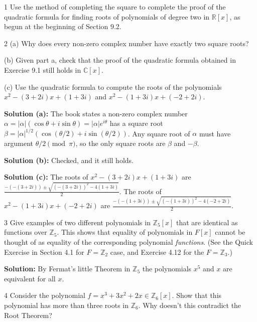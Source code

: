 \begin{problem}{1}
    Use the method of completing the square to complete the proof of the quadratic
    formula for finding roots of polynomials of degree two in $\mathbb{R}[x]$, as begun at
    the beginning of Section 9.2.
\end{problem}
\unsolved

\begin{problem}{2}
    (a) Why does every non-zero complex number have exactly 
        two square roots?

    (b) Given part a, check that the proof of the quadratic formula 
        obtained in Exercise 9.1 still holds in $\mathbb{C}[x]$.

    (c) Use the quadratic formula to compute the roots of the polynomials 
        $x^2 - (3 + 2i)x + (1 + 3i)$ and $x^2 - (1 + 3i)x + (-2 + 2i)$.
\end{problem}
\solved

\textbf{Solution (a):}
The book states a non-zero complex number $\alpha = |\alpha|(\cos \theta + i \sin \theta) = |\alpha|e^{i \theta}$
has a square root $\beta = |\alpha|^{1/2}(\cos(\theta/2) + i \sin(\theta/2))$.
Any square root of $\alpha$ must have argument $\theta/2 \pmod{\pi}$, so the only square roots are $\beta$ and $-\beta$.

\textbf{Solution (b):} Checked, and it still holds.

\textbf{Solution (c):}
The roots of $x^2 - (3 + 2i)x + (1 + 3i)$ are
$\frac{-(-(3 + 2i)) \pm \sqrt{(-(3 + 2i))^2 - 4(1 + 3i)}}{2}$.
The roots of $x^2 - (1 + 3i)x + (-2 + 2i)$ are
$\frac{-(-(1 + 3i)) \pm \sqrt{(-(1 + 3i))^2 - 4(-2 + 2i)}}{2}$.

\begin{problem}{3}
    Give examples of two different polynomials in $\mathbb{Z}_5[x]$
    that are identical as functions over $\mathbb{Z}_5$.
    This shows that equality of polynomials in $F[x]$ cannot be 
    thought of as equality of the corresponding polynomial \emph{functions}.
    (See the Quick Exercise in Section 4.1 for $F = \mathbb{Z}_2$ case, and 
    Exercise 4.12 for the $F = \mathbb{Z}_3$.)
\end{problem}
\solved

\textbf{Solution:} By Fermat's little Theorem in $\mathbb{Z}_5$
the polynomials $x^5$ and $x$ are equivalent for all $x$.

\begin{problem}{4}
    Consider the polynomial $f = x^3 + 3x^2 + 2x \in \mathbb{Z}_6[x]$.
    Show that this polynomial has more than three roots in $\mathbb{Z}_6$.
    Why doesn't this contradict the Root Theorem?
\end{problem}
\solved

